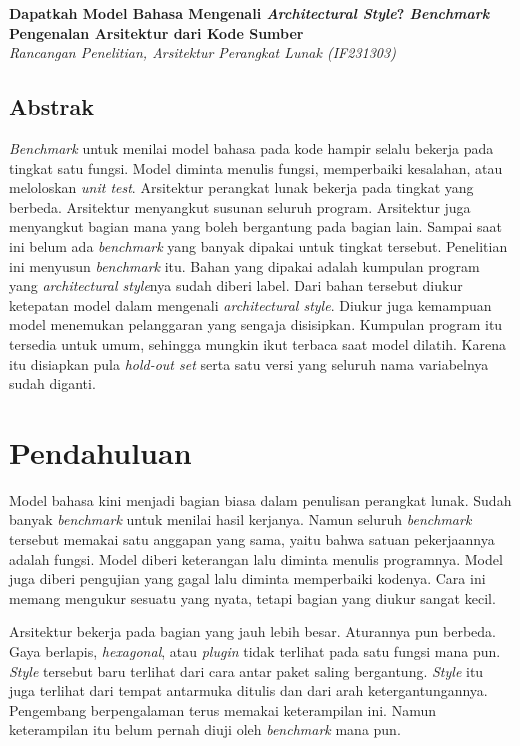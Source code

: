 \documentclass[11pt,a4paper]{article}
\begin{document}
\begin{center}
  {\LARGE\bfseries Dapatkah Model Bahasa Mengenali \textit{Architectural Style}? \textit{Benchmark} Pengenalan Arsitektur dari Kode Sumber}\\[0.6em]
  {\small\itshape Rancangan Penelitian, Arsitektur Perangkat Lunak (IF231303)}
\end{center}

\vspace{1em}

\subsection*{Abstrak}

\textit{Benchmark} untuk menilai model bahasa pada kode hampir selalu bekerja pada tingkat satu fungsi. Model diminta menulis fungsi, memperbaiki kesalahan, atau meloloskan \textit{unit test}. Arsitektur perangkat lunak bekerja pada tingkat yang berbeda. Arsitektur menyangkut susunan seluruh program. Arsitektur juga menyangkut bagian mana yang boleh bergantung pada bagian lain. Sampai saat ini belum ada \textit{benchmark} yang banyak dipakai untuk tingkat tersebut. Penelitian ini menyusun \textit{benchmark} itu. Bahan yang dipakai adalah kumpulan program yang \textit{architectural style}nya sudah diberi label. Dari bahan tersebut diukur ketepatan model dalam mengenali \textit{architectural style}. Diukur juga kemampuan model menemukan pelanggaran yang sengaja disisipkan. Kumpulan program itu tersedia untuk umum, sehingga mungkin ikut terbaca saat model dilatih. Karena itu disiapkan pula \textit{hold-out set} serta satu versi yang seluruh nama variabelnya sudah diganti.

\section{Pendahuluan}

Model bahasa kini menjadi bagian biasa dalam penulisan perangkat lunak. Sudah banyak \textit{benchmark} untuk menilai hasil kerjanya. Namun seluruh \textit{benchmark} tersebut memakai satu anggapan yang sama, yaitu bahwa satuan pekerjaannya adalah fungsi. Model diberi keterangan lalu diminta menulis programnya. Model juga diberi pengujian yang gagal lalu diminta memperbaiki kodenya. Cara ini memang mengukur sesuatu yang nyata, tetapi bagian yang diukur sangat kecil.

Arsitektur bekerja pada bagian yang jauh lebih besar. Aturannya pun berbeda. Gaya berlapis, \textit{hexagonal}, atau \textit{plugin} tidak terlihat pada satu fungsi mana pun. \textit{Style} tersebut baru terlihat dari cara antar paket saling bergantung. \textit{Style} itu juga terlihat dari tempat antarmuka ditulis dan dari arah ketergantungannya. Pengembang berpengalaman terus memakai keterampilan ini. Namun keterampilan itu belum pernah diuji oleh \textit{benchmark} mana pun.
\end{document}
